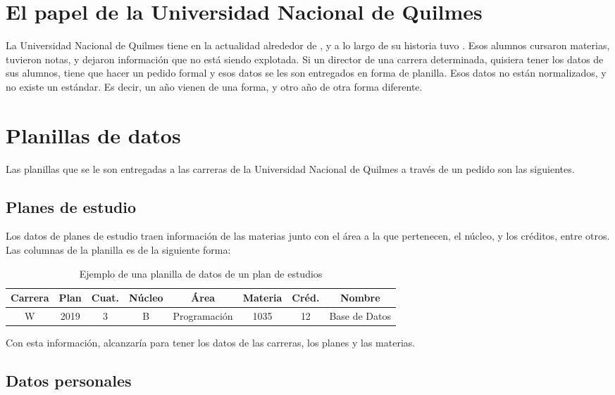\section[El papel de la Universidad Nacional de Quilmes]{El papel de la Universidad Nacional de Quilmes}

La Universidad Nacional de Quilmes tiene en la actualidad alrededor de , y a lo largo de su historia tuvo . Esos alumnos cursaron materias, tuvieron notas, y dejaron información que no está siendo explotada.
Si un director de una carrera determinada, quisiera tener los datos de sus alumnos, tiene que hacer un pedido formal y esos datos se les son entregados en forma de planilla. Esos datos no están normalizados, y no existe un estándar. Es decir, un año vienen de una forma, y otro año de otra forma diferente.

\section[Planillas de datos]{Planillas de datos}

Las planillas que se le son entregadas a las carreras de la Universidad Nacional de Quilmes a través de un pedido son las siguientes.

\subsection[Planes de estudio]{Planes de estudio}

Los datos de planes de estudio traen información de las materias junto con el área a la que pertenecen, el núcleo, y los créditos, entre otros.
Las columnas de la planilla es de la siguiente forma:

\begin{table}[!htbp]
    \centering
    \begin{tabular}{|c|c|c|c|c|c|c|c|}
    \hline
    Carrera & Plan & Cuat. & Núcleo & Área & Materia & Créd. & Nombre \\ \hline
    W & 2019 & 3 & B & Programación & 1035 & 12 & Base de Datos  \\
    \hline
    \end{tabular}
    \caption{Ejemplo de una planilla de datos de un plan de estudios}
    \label{tab:tabla_planes}
\end{table}

Con esta información, alcanzaría para tener los datos de las carreras, los planes y las materias.

\subsection[Datos personales]{Datos personales}

